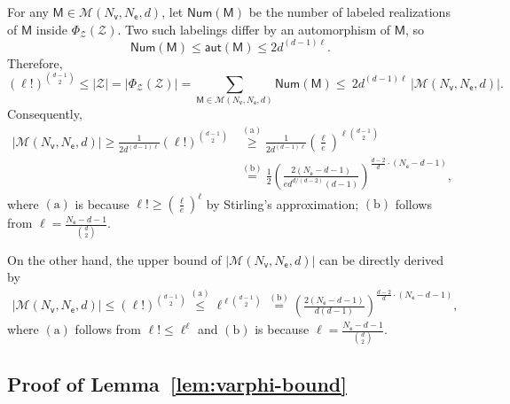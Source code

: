 \documentclass[letterpaper,11pt]{article}
\theoremstyle{definition}
\newcommand{\maM}{\mathcal{M}}
\newcommand{\nbr}[1]{{\sf\color{red}[#1]}}
\newcommand{\pth}[1]{\left( #1 \right)}
\newcommand{\sfM}{{\mathsf{M}}}
\newcommand{\sfe}{{\mathsf{e}}}
\newcommand{\sfv}{{\mathsf{v}}}
\newcommand{\aut}{\mathsf{aut}}
\begin{document}
For any $\sfM\in\mathcal{M}(N_\sfv,N_\sfe,d)$, let
$\mathsf{Num}(\sfM)$ be the number of labeled realizations of $\sfM$ inside $\Phi_{\mathcal{Z}}(\mathcal{Z})$.
Two such labelings differ by an automorphism of $\sfM$, so
\[
\mathsf{Num}(\sfM)\le\aut(\sfM)\le 2d^{(d-1)\ell}.
\]
Therefore,
\[
(\ell!)^{\binom{d-1}{2}}\le |\mathcal{Z}|=|\Phi_{\mathcal{Z}}(\mathcal{Z})|
=\sum_{\sfM\in\mathcal{M}(N_\sfv,N_\sfe,d)} \mathsf{Num}(\sfM)\le\ 2d^{(d-1)\ell}\,|\mathcal{M}(N_\sfv,N_\sfe,d)|.
\]
Consequently,
\begin{align*}  |\maM(N_\sfv,N_\sfe,d)|\ge \frac{1}{2d^{(d-1)\ell}} \pth{\ell!}^{\binom{d-1}{2}}&\overset{\mathrm{(a)}}{\ge}\frac{1}{2d^{(d-1)\ell}} \pth{\frac{\ell}{e}}^{\ell\binom{d-1}{2}}\\&\overset{\mathrm{(b)}}{=}\frac{1}{2}\pth{\frac{2(N_\sfe-d-1)}{ed^{d/(d-2)}(d-1)}}^{\frac{d-2}{d}\cdot (N_\sfe-d-1)},
\end{align*}
where $\mathrm{(a)}$ is because $\ell!\ge \pth{\frac{\ell}{e}}^{\ell}$ by Stirling's approximation; $\mathrm{(b)}$ follows from $\ell = \frac{N_\sfe-d-1}{\binom{d}{2}}$.

On the other hand, the upper bound of $|\maM(N_\sfv,N_\sfe,d)|$ can be directly derived by \begin{align*}
    |\maM(N_\sfv,N_\sfe,d)|\le (\ell!)^{\binom{d-1}{2}}\overset{\mathrm{(a)}}{\le} \ell^{\ell\binom{d-1}{2}}\overset{\mathrm{(b)}}{=}\pth{\frac{2(N_\sfe-d-1)}{d(d-1)}}^{\frac{d-2}{d}\cdot(N_\sfe-d-1)}, 
\end{align*}
where $\mathrm{(a)}$ follows from $\ell!\le \ell^\ell$ and $\mathrm{(b)}$ is because $\ell = \frac{N_\sfe-d-1}{\binom{d}{2}}$.

\subsection{Proof of Lemma~\ref{lem:varphi-bound}}\label{apd:proof-lemma-varphi-bound}
\end{document}
